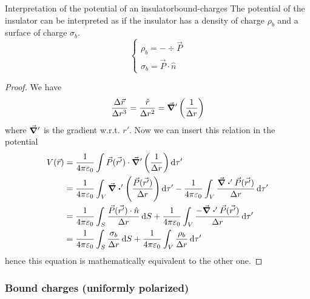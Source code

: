 \documentclass[12pt]{extarticle}
\begin{document}
\begin{proposition}{Interpretation of the potential of an insulator}{bound-charges}
    The potential of the insulator can be interpreted as if the insulator has a density of charge $\rho_b$ and a surface of charge $\sigma_b$.
    \begin{equation}
        \begin{cases}
            \rho_b = - \div \vec P \\
            \sigma_b = \vec P \cdot \hat n
        \end{cases}
    \end{equation}
\end{proposition}

\begin{proof}
    We have
    \begin{equation}
        \frac{\Delta \vec r}{\Delta r^3} = \frac{\hat{r}}{\Delta r^2} = \grad ' \left( \frac{1}{\Delta r}\right)
    \end{equation}
    where $\grad '$ is the gradient w.r.t. $r'$.
    Now we can insert this relation in the potential
    \begin{align}
        V(\vec r) & = \frac{1}{4 \pi \varepsilon_0} \int \vec P (\vec{r'}) \cdot \grad ' \left( \frac{1}{\Delta r}\right) \dd{\tau '}                                                                                    \\
                  & = \frac{1}{4 \pi \varepsilon_0} \int_V \div' \left(\frac{\vec P (\vec{r'})}{\Delta r}\right) \dd{\tau '} - \frac{1}{4 \pi \varepsilon_0} \int_V \frac{\div' \vec P (\vec{r'})}{\Delta r} \dd{\tau '} \\
                  & = \frac{1}{4 \pi \varepsilon_0} \int_S \frac{\vec P (\vec{r'}) \cdot \hat n}{\Delta r} \dd{S} + \frac{1}{4 \pi \varepsilon_0} \int_V \frac{-\div' \vec P (\vec{r'})}{\Delta r} \dd{\tau '}           \\
                  & = \frac{1}{4 \pi \varepsilon_0} \int_S \frac{\sigma_b}{\Delta r} \dd{S} + \frac{1}{4 \pi \varepsilon_0} \int_V \frac{\rho_b}{\Delta r} \dd{\tau '}
    \end{align}
    hence this equation is mathematically equivalent to the other one.
\end{proof}

\subsubsection{Bound charges (uniformly polarized)}
\end{document}
